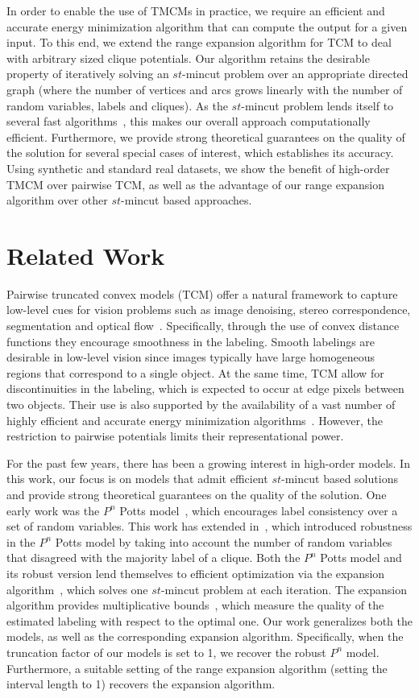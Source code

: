 \documentclass[runningheads]{llncs}
\newcommand{\mysection}[1]{\vspace{-2mm}\section{#1}\vspace{-2mm}}
\begin{document}
In order to enable the use of TMCMs in practice, we require an efficient and accurate energy minimization algorithm
that can compute the output for a given input. To this end, we extend the range expansion algorithm for TCM to
deal with arbitrary sized clique potentials. Our algorithm retains the desirable property of iteratively solving an $st$-{\sc mincut} problem over
an appropriate directed graph (where the number of vertices and arcs grows linearly with the number of random variables, labels and cliques). As the $st$-{\sc mincut}
problem lends itself to several fast algorithms~\cite{boykovpami04}, this makes our overall approach computationally efficient. Furthermore,
we provide strong theoretical guarantees on the quality of the solution for several special cases of interest,
which establishes its accuracy. Using synthetic and standard real
datasets, we show the benefit of high-order TMCM over pairwise TCM, as well as the advantage of our range expansion
algorithm over other $st$-{\sc mincut} based approaches.

\mysection{Related Work}
Pairwise truncated convex models (TCM) offer a natural framework to capture low-level cues for
vision problems such as image denoising, stereo correspondence, segmentation and
optical flow~\cite{szeliskipami08}.
Specifically, through the use of convex distance functions they encourage smoothness in the labeling. Smooth labelings
are desirable in low-level vision since images typically have large homogeneous regions
that correspond to a single object. At the same time, TCM
allow for discontinuities in the labeling, which is expected to occur at edge pixels between two objects.
Their use is also supported by the availability of a vast number of highly efficient and accurate energy minimization
algorithms~\cite{boykovpami01,chekurisoda01,guptastoc00,kolmogorovpami06,komodakisiccv07,komodakiscvpr07,kumarnips08,vekslercvpr07}.
However, the restriction to pairwise potentials limits their representational power.

For the past few years, there has been a growing interest in high-order models. In this work, our
focus is on models that admit efficient $st$-{\sc mincut} based solutions and provide strong theoretical guarantees on the
quality of the solution. One early work was the $P^n$ Potts model~\cite{kohlicvpr07}, which encourages label consistency
over a set of random variables. This work has extended in~\cite{kohlicvpr08}, which introduced robustness in the $P^n$ Potts model by
taking into account the number of random variables that disagreed with the majority label of a clique. Both the $P^n$ Potts
model and its robust version lend themselves to efficient optimization via the expansion algorithm~\cite{boykovpami01}, which solves
one $st$-{\sc mincut} problem at each iteration. The expansion algorithm provides multiplicative bounds~\cite{gouldcvpr09},
which measure the quality of the estimated labeling with respect to the optimal one. Our work generalizes both
the models, as well as the corresponding
expansion algorithm. Specifically, when the truncation factor of our models is set to 1, we recover the robust $P^n$ model.
Furthermore, a suitable setting of the range expansion algorithm (setting the interval length to 1) recovers the
expansion algorithm.
\end{document}
